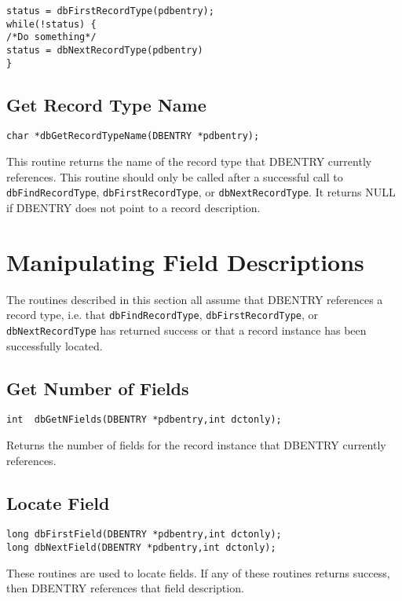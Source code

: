 \begin{verbatim}status = dbFirstRecordType(pdbentry);
while(!status) {
/*Do something*/
status = dbNextRecordType(pdbentry)
}
\end{verbatim}\subsection{Get Record Type Name}

\begin{verbatim}char *dbGetRecordTypeName(DBENTRY *pdbentry);
\end{verbatim}This routine returns the name of the record type that DBENTRY currently references. This routine should only be called 
after a successful call to \verb|dbFindRecordType|, \verb|dbFirstRecordType|, or \verb|dbNextRecordType|. It returns NULL if 
DBENTRY does not point to a record description.

\section{Manipulating Field Descriptions}

The routines described in this section all assume that DBENTRY references a record type, i.e. that 
\verb|dbFindRecordType|, \verb|dbFirstRecordType|, or \verb|dbNextRecordType| has returned success or that a record instance 
has been successfully located.

\subsection{Get Number of Fields}

\begin{verbatim}int  dbGetNFields(DBENTRY *pdbentry,int dctonly);
\end{verbatim}Returns the number of fields for the record instance that DBENTRY currently references.

\subsection{Locate Field}

\begin{verbatim}long dbFirstField(DBENTRY *pdbentry,int dctonly);
long dbNextField(DBENTRY *pdbentry,int dctonly);
\end{verbatim}
These routines are used to locate fields. If any of these routines returns success, then DBENTRY references that field 
description. 

